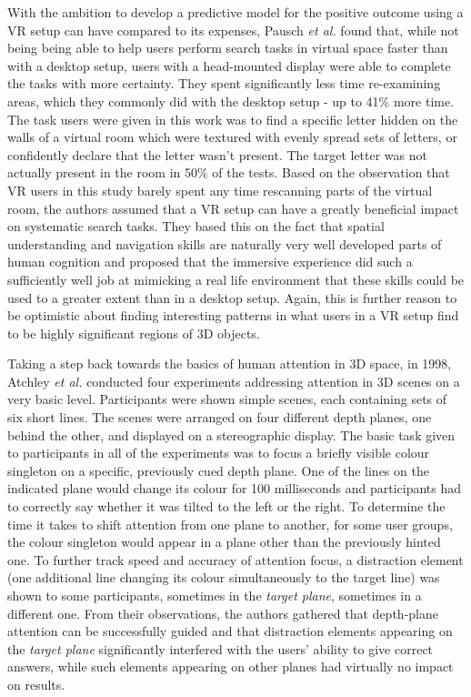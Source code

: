 With the ambition to develop a predictive model for the positive outcome using a VR setup can have compared to its expenses, Pausch \textit{et al.} \cite{pausch1997quantifying} found that, while not being being able to help users perform search tasks in virtual space faster than with a desktop setup, users with a head-mounted display were able to complete the tasks with more certainty. They spent significantly less time re-examining areas, which they commonly did with the desktop setup - up to 41\% more time. The task users were given in this work was to find a specific letter hidden on the walls of a virtual room which were textured with evenly spread sets of letters, or confidently declare that the letter wasn't present. The target letter was not actually present in the room in 50\% of the tests. Based on the observation that VR users in this study barely spent any time rescanning parts of the virtual room, the authors assumed that a VR setup can have a greatly beneficial impact on systematic search tasks. They based this on the fact that spatial understanding and navigation skills are naturally very well developed parts of human cognition and proposed that the immersive experience did such a sufficiently well job at mimicking a real life environment that these skills could be used to a greater extent than in a desktop setup. Again, this is further reason to be optimistic about finding interesting patterns in what users in a VR setup find to be highly significant regions of 3D objects.

Taking a step back towards the basics of human attention in 3D space, in 1998, Atchley \textit{et al.} \cite{atchleyattentional} conducted four experiments addressing attention in 3D scenes on a very basic level. Participants were shown simple scenes, each containing sets of six short lines. The scenes were arranged on four different depth planes, one behind the other, and displayed on a stereographic display. The basic task given to participants in all of the experiments was to focus a briefly visible colour singleton on a specific, previously cued depth plane. One of the lines on the indicated plane would change its colour for 100 milliseconds and participants had to correctly say whether it was tilted to the left or the right. To determine the time it takes to shift attention from one plane to another, for some user groups, the colour singleton would appear in a plane other than the previously hinted one. To further track speed and accuracy of attention focus, a distraction element (one additional line changing its colour simultaneously to the target line) was shown to some participants, sometimes in the \textit{target plane}, sometimes in a different one. From their observations, the authors gathered that depth-plane attention can be successfully guided and that distraction elements appearing on the \textit{target plane} significantly interfered with the users' ability to give correct answers, while such elements appearing on other planes had virtually no impact on results.

